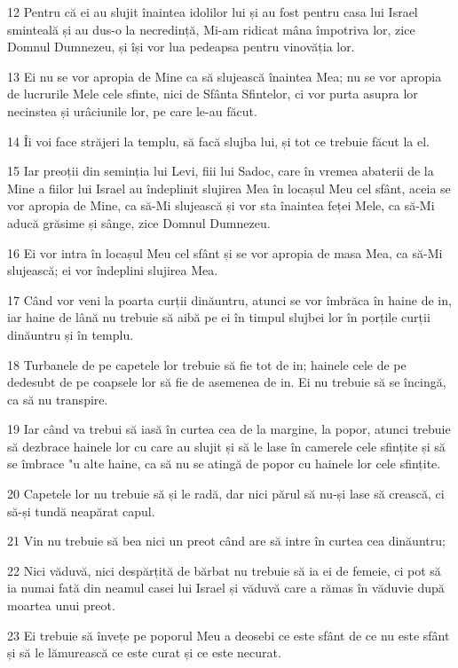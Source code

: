 \par 12 Pentru că ei au slujit înaintea idolilor lui și au fost pentru casa lui Israel sminteală și au dus-o la necredință, Mi-am ridicat mâna împotriva lor, zice Domnul Dumnezeu, și își vor lua pedeapsa pentru vinovăția lor.
\par 13 Ei nu se vor apropia de Mine ca să slujească înaintea Mea; nu se vor apropia de lucrurile Mele cele sfinte, nici de Sfânta Sfintelor, ci vor purta asupra lor necinstea și urâciunile lor, pe care le-au făcut.
\par 14 Îi voi face străjeri la templu, să facă slujba lui, și tot ce trebuie făcut la el.
\par 15 Iar preoții din seminția lui Levi, fiii lui Sadoc, care în vremea abaterii de la Mine a fiilor lui Israel au îndeplinit slujirea Mea în locașul Meu cel sfânt, aceia se vor apropia de Mine, ca să-Mi slujească și vor sta înaintea feței Mele, ca să-Mi aducă grăsime și sânge, zice Domnul Dumnezeu.
\par 16 Ei vor intra în locașul Meu cel sfânt și se vor apropia de masa Mea, ca să-Mi slujească; ei vor îndeplini slujirea Mea.
\par 17 Când vor veni la poarta curții dinăuntru, atunci se vor îmbrăca în haine de in, iar haine de lână nu trebuie să aibă pe ei în timpul slujbei lor în porțile curții dinăuntru și în templu.
\par 18 Turbanele de pe capetele lor trebuie să fie tot de in; hainele cele de pe dedesubt de pe coapsele lor să fie de asemenea de in. Ei nu trebuie să se încingă, ca să nu transpire.
\par 19 Iar când va trebui să iasă în curtea cea de la margine, la popor, atunci trebuie să dezbrace hainele lor cu care au slujit și să le lase în camerele cele sfințite și să se îmbrace "u alte haine, ca să nu se atingă de popor cu hainele lor cele sfințite.
\par 20 Capetele lor nu trebuie să și le radă, dar nici părul să nu-și lase să crească, ci să-și tundă neapărat capul.
\par 21 Vin nu trebuie să bea nici un preot când are să intre în curtea cea dinăuntru;
\par 22 Nici văduvă, nici despărțită de bărbat nu trebuie să ia ei de femeie, ci pot să ia numai fată din neamul casei lui Israel și văduvă care a rămas în văduvie după moartea unui preot.
\par 23 Ei trebuie să învețe pe poporul Meu a deosebi ce este sfânt de ce nu este sfânt și să le lămurească ce este curat și ce este necurat.
